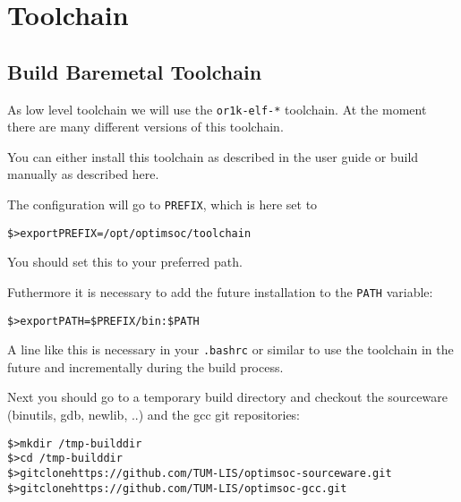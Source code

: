 \chapter{Toolchain}
\label{chap:toolchain}

\section{Build Baremetal Toolchain}

As low level toolchain we will use the \verb|or1k-elf-*| toolchain. At
the moment there are many different versions of this toolchain.

You can either install this toolchain as described in the user guide
or build manually as described here.

The configuration will go to \verb|PREFIX|, which is here set to

\begin{alltt}
\$> export PREFIX=/opt/optimsoc/toolchain
\end{alltt}

You should set this to your preferred path.

Futhermore it is necessary to add the future installation to the
\verb|PATH| variable:

\begin{alltt}
\$> export PATH=\$PREFIX/bin:\$PATH
\end{alltt}

A line like this is necessary in your \verb|.bashrc| or similar to use
the toolchain in the future and incrementally during the build
process.

Next you should go to a temporary build directory and checkout
the sourceware (binutils, gdb, newlib, ..) and the gcc git
repositories:

\begin{alltt}
\$> mkdir ~/tmp-builddir
\$> cd ~/tmp-builddir
\$> git clone https://github.com/TUM-LIS/optimsoc-sourceware.git
\$> git clone https://github.com/TUM-LIS/optimsoc-gcc.git
\end{alltt}

%
%

